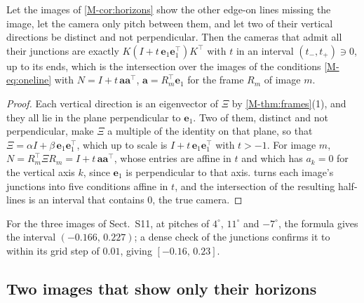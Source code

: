 \begin{remark}\label{cor:pitch}
Let the images of \cref{M-cor:horizons} show the other edge-on lines missing the image, let the camera only pitch between them, and let two of their vertical directions be distinct and not perpendicular. Then the cameras that admit all their junctions are exactly $K(I+t\,\mathbf e_1\mathbf e_1^{\top})K^{\top}$ with $t$ in an interval $(t_-,t_+)\ni0$, up to its ends, which is the intersection over the images of the conditions \eqref{M-eq:oneline} with $N=I+t\,\mathbf a\mathbf a^{\top}$, $\mathbf a=R_m^{\top}\mathbf e_1$ for the frame $R_m$ of image $m$.
\end{remark}
\begin{proof}
Each vertical direction is an eigenvector of $\Xi$ by \cref{M-thm:frames}(1), and they all lie in the plane perpendicular to $\mathbf e_1$. Two of them, distinct and not perpendicular, make $\Xi$ a multiple of the identity on that plane, so that $\Xi=\alpha I+\beta\,\mathbf e_1\mathbf e_1^{\top}$, which up to scale is $I+t\,\mathbf e_1\mathbf e_1^{\top}$ with $t>-1$. For image $m$, $N=R_m^{\top}\Xi R_m=I+t\,\mathbf a\mathbf a^{\top}$, whose entries are affine in $t$ and which has $a_k=0$ for the vertical axis $k$, since $\mathbf e_1$ is perpendicular to that axis.  turns each image's junctions into five conditions affine in $t$, and the intersection of the resulting half-lines is an interval that contains $0$, the true camera.
\end{proof}

For the three images of Sect.~S11, at pitches of $4^\circ$, $11^\circ$ and $-7^\circ$, the formula gives the interval $(-0.166,\,0.227)$; a dense check of the junctions confirms it to within its grid step of $0.01$, giving $[-0.16,\,0.23]$.

\subsection{Two images that show only their horizons}

